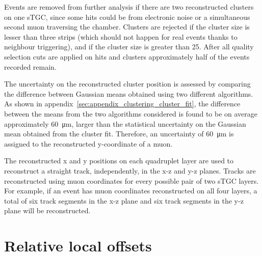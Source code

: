 Events are removed from further analysis if there are two reconstructed clusters on one sTGC, since some hits could be from electronic noise or a simultaneous second muon traversing the chamber. Clusters are rejected if the cluster size is lesser than three strips (which should not happen for real events thanks to neighbour triggering), and if the cluster size is greater than 25. After all quality selection cuts are applied on hits and clusters approximately half of the events recorded remain.

The uncertainty on the reconstructed cluster position is assessed by comparing the difference between Gaussian means obtained using two different algorithms. As shown in appendix~\ref{sec:appendix_clustering_cluster_fit}, the difference between the means from the two algorithms considered is found to be on average approximately \SI{60}{\micro\meter}, larger than the statistical uncertainty on the Gaussian mean obtained from the cluster fit. Therefore, an uncertainty of \SI{60}{\micro\meter} is assigned to the reconstructed y-coordinate of a muon. 

The reconstructed x and y positions on each quadruplet layer are used to reconstruct a straight track, independently, in the x-z and y-z planes. Tracks are reconstructed using muon coordinates for every possible pair of two sTGC layers.  For example, if an event has muon coordinates reconstructed on all four layers, a total of six track segments in the x-z plane and six track segments in the y-z plane will be reconstructed. 



\section{Relative local offsets}

